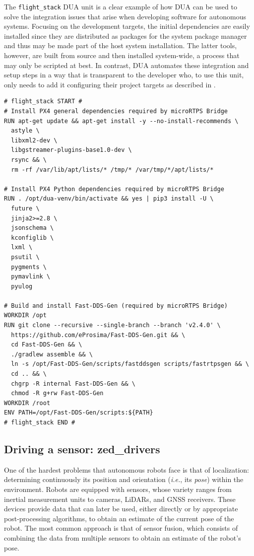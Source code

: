 The \texttt{flight\_stack} DUA unit is a clear example of how DUA can be used to solve the integration issues that arise when developing software for autonomous systems. Focusing on the development targets, the initial dependencies are easily installed since they are distributed as packages for the system package manager and thus may be made part of the host system installation. The latter tools, however, are built from source and then installed system-wide, a process that may only be scripted at best. In contrast, DUA automates these integration and setup steps in a way that is transparent to the developer who, to use this unit, only needs to add it configuring their project targets as described in .

\begin{center}
\begin{minipage}[t]{.9\textwidth}
\begin{lstlisting}[caption={Unit configuration of the \texttt{jetson5} target of the \texttt{flight\_stack} DUA unit \cite{masocco_flight_stack_nodate} as of November 26, 2024.}, label={lst:flightstack}]
# flight_stack START #
# Install PX4 general dependencies required by microRTPS Bridge
RUN apt-get update && apt-get install -y --no-install-recommends \
  astyle \
  libxml2-dev \
  libgstreamer-plugins-base1.0-dev \
  rsync && \
  rm -rf /var/lib/apt/lists/* /tmp/* /var/tmp/*/apt/lists/*

# Install PX4 Python dependencies required by microRTPS Bridge
RUN . /opt/dua-venv/bin/activate && yes | pip3 install -U \
  future \
  jinja2>=2.8 \
  jsonschema \
  kconfiglib \
  lxml \
  psutil \
  pygments \
  pymavlink \
  pyulog

# Build and install Fast-DDS-Gen (required by microRTPS Bridge)
WORKDIR /opt
RUN git clone --recursive --single-branch --branch 'v2.4.0' \
  https://github.com/eProsima/Fast-DDS-Gen.git && \
  cd Fast-DDS-Gen && \
  ./gradlew assemble && \
  ln -s /opt/Fast-DDS-Gen/scripts/fastddsgen scripts/fastrtpsgen && \
  cd .. && \
  chgrp -R internal Fast-DDS-Gen && \
  chmod -R g+rw Fast-DDS-Gen
WORKDIR /root
ENV PATH=/opt/Fast-DDS-Gen/scripts:${PATH}
# flight_stack END #
\end{lstlisting}
\end{minipage}
\end{center}

\subsection{Driving a sensor: zed\_drivers}
\label{sec:dua_modules_zed_drivers}
One of the hardest problems that autonomous robots face is that of localization: determining continuously its position and orientation (\emph{i.e.}, its \emph{pose}) within the environment. Robots are equipped with sensors, whose variety ranges from inertial measurement units to cameras, LiDARs, and GNSS receivers. These devices provide data that can later be used, either directly or by appropriate post-processing algorithms, to obtain an estimate of the current pose of the robot. The most common approach is that of sensor fusion, which consists of combining the data from multiple sensors to obtain an estimate of the robot's pose.

